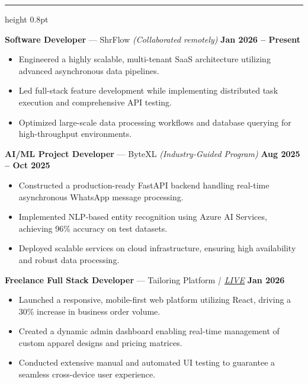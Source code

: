 \documentclass[10pt,a4paper]{article}
\newcommand{\resumesection}[1]{%
  \vspace{5pt}%
  \noindent{\large\textbf{#1}}\par
  \vspace{1pt}%
  \hrule height 0.8pt
  \vspace{3pt}%
}
\begin{document}
\resumesection{WORK EXPERIENCE}

\noindent\textbf{Software Developer} --- ShrFlow \textit{(Collaborated remotely)} \hfill \textbf{Jan 2026 -- Present}
\begin{itemize}[leftmargin=1.2em, topsep=1pt, itemsep=0pt, parsep=0pt]
    \item Engineered a highly scalable, multi-tenant SaaS architecture utilizing advanced asynchronous data pipelines.
    \item Led full-stack feature development while implementing distributed task execution and comprehensive API testing.
    \item Optimized large-scale data processing workflows and database querying for high-throughput environments.
\end{itemize}

\vspace{3pt}

\noindent\textbf{AI/ML Project Developer} --- ByteXL \textit{(Industry-Guided Program)} \hfill \textbf{Aug 2025 -- Oct 2025}
\begin{itemize}[leftmargin=1.2em, topsep=1pt, itemsep=0pt, parsep=0pt]
    \item Constructed a production-ready FastAPI backend handling real-time asynchronous WhatsApp message processing.
    \item Implemented NLP-based entity recognition using Azure AI Services, achieving 96\% accuracy on test datasets.
    \item Deployed scalable services on cloud infrastructure, ensuring high availability and robust data processing.
\end{itemize}

\vspace{3pt}

\noindent\textbf{Freelance Full Stack Developer} --- Tailoring Platform \textit{|\ \href{https://tailoring-red.vercel.app}{LIVE}} \hfill \textbf{Jan 2026}
\begin{itemize}[leftmargin=1.2em, topsep=1pt, itemsep=0pt, parsep=0pt]
    \item Launched a responsive, mobile-first web platform utilizing React, driving a 30\% increase in business order volume.
    \item Created a dynamic admin dashboard enabling real-time management of custom apparel designs and pricing matrices.
    \item Conducted extensive manual and automated UI testing to guarantee a seamless cross-device user experience.
\end{itemize}
\end{document}
